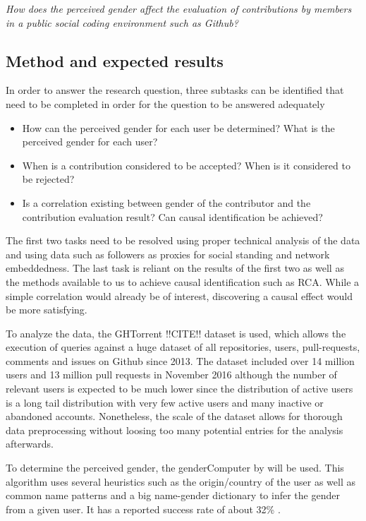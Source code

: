 \emph{How does the perceived gender affect the evaluation of contributions by members in a public social coding environment such as Github?}

\subsection{Method and expected results}

In order to answer the research question, three subtasks can be identified that need to be completed in order for the question to be answered adequately
\begin{itemize}
    \item How can the perceived gender for each user be determined? What is the perceived gender for each user?
    \item When is a contribution considered to be accepted? When is it considered to be rejected?
    \item Is a correlation existing between gender of the contributor and the contribution evaluation result? Can causal identification be achieved?%
\end{itemize}

The first two tasks need to be resolved using proper technical analysis of the data and using data such as followers as proxies for social standing and network embeddedness. The last task is reliant on the results of the first two as well as the methods available to us to achieve causal identification such as \ac{RCA}. While a simple correlation would already be of interest, discovering a causal effect would be more satisfying.

To analyze the data, the GHTorrent !!CITE!! dataset is used, which allows the execution of queries against a huge dataset of all repositories, users, pull-requests, comments and issues on Github since 2013. The dataset included over 14 million users and 13 million pull requests in November 2016 although the number of relevant users is expected to be much lower since the distribution of active users is a long tail distribution with very few active users and many inactive or abandoned accounts. Nonetheless, the scale of the dataset allows for thorough data preprocessing without loosing too many potential entries for the analysis afterwards.

To determine the perceived gender, the genderComputer by \citeauthor{vasilescu:2012:6542459} will be used. This algorithm uses several heuristics such as the origin/country of the user as well as common name patterns and a big name-gender dictionary to infer the gender from a given user. It has a reported success rate of about 32\% \cite{Vasilescu:2015:GTD:2702123.2702549}.

